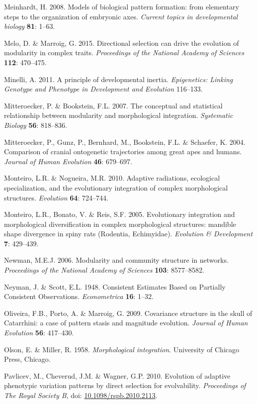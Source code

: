 \documentclass[12pt,]{article}
\begin{document}
Meinhardt, H. 2008. Models of biological pattern formation: from
elementary steps to the organization of embryonic axes. \emph{Current
topics in developmental biology} \textbf{81}: 1--63.

Melo, D. \& Marroig, G. 2015. Directional selection can drive the
evolution of modularity in complex traits. \emph{Proceedings of the
National Academy of Sciences} \textbf{112}: 470--475.

Minelli, A. 2011. A principle of developmental inertia.
\emph{Epigenetics: Linking Genotype and Phenotype in Development and
Evolution} 116--133.

Mitteroecker, P. \& Bookstein, F.L. 2007. The conceptual and statistical
relationship between modularity and morphological integration.
\emph{Systematic Biology} \textbf{56}: 818--836.

Mitteroecker, P., Gunz, P., Bernhard, M., Bookstein, F.L. \& Schaefer,
K. 2004. Comparison of cranial ontogenetic trajectories among great apes
and humans. \emph{Journal of Human Evolution} \textbf{46}: 679--697.

Monteiro, L.R. \& Nogueira, M.R. 2010. Adaptive radiations, ecological
specialization, and the evolutionary integration of complex
morphological structures. \emph{Evolution} \textbf{64}: 724--744.

Monteiro, L.R., Bonato, V. \& Reis, S.F. 2005. Evolutionary integration
and morphological diversification in complex morphological structures:
mandible shape divergence in spiny rats (Rodentia, Echimyidae).
\emph{Evolution \& Development} \textbf{7}: 429--439.

Newman, M.E.J. 2006. Modularity and community structure in networks.
\emph{Proceedings of the National Academy of Sciences} \textbf{103}:
8577--8582.

Neyman, J. \& Scott, E.L. 1948. Consistent Estimates Based on Partially
Consistent Observations. \emph{Econometrica} \textbf{16}: 1--32.

Oliveira, F.B., Porto, A. \& Marroig, G. 2009. Covariance structure in
the skull of Catarrhini: a case of pattern stasis and magnitude
evolution. \emph{Journal of Human Evolution} \textbf{56}: 417--430.

Olson, E. \& Miller, R. 1958. \emph{Morphological integration}.
University of Chicago Press, Chicago.

Pavlicev, M., Cheverud, J.M. \& Wagner, G.P. 2010. Evolution of adaptive
phenotypic variation patterns by direct selection for evolvability.
\emph{Proceedings of The Royal Society B}, doi:
\href{http://dx.doi.org/10.1098/rspb.2010.2113}{10.1098/rspb.2010.2113}.
\end{document}
